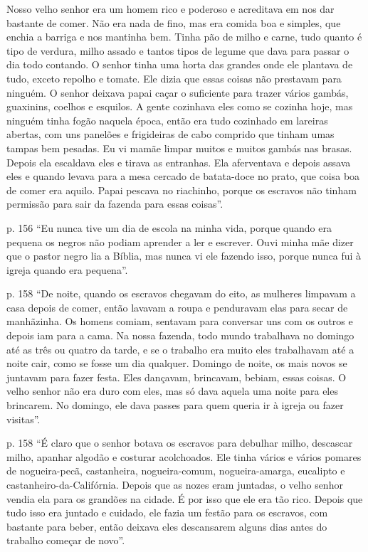 Nosso velho senhor era um homem rico e poderoso e acreditava em nos dar
bastante de comer. Não era nada de fino, mas era comida boa e simples,
que enchia a barriga e nos mantinha bem. Tinha pão de milho e carne,
tudo quanto é tipo de verdura, milho assado e tantos tipos de legume que
dava para passar o dia todo contando. O senhor tinha uma horta das
grandes onde ele plantava de tudo, exceto repolho e tomate. Ele dizia
que essas coisas não prestavam para ninguém. O senhor deixava papai
caçar o suficiente para trazer vários gambás, guaxinins, coelhos e
esquilos. A gente cozinhava eles como se cozinha hoje, mas ninguém tinha
fogão naquela época, então era tudo cozinhado em lareiras abertas, com
uns panelões e frigideiras de cabo comprido que tinham umas tampas bem
pesadas. Eu vi mamãe limpar muitos e muitos gambás nas brasas. Depois
ela escaldava eles e tirava as entranhas. Ela aferventava e depois
assava eles e quando levava para a mesa cercado de batata-doce no prato,
que coisa boa de comer era aquilo. Papai pescava no riachinho, porque os
escravos não tinham permissão para sair da fazenda para essas coisas''.

p. 156 ``Eu nunca tive um dia de escola na minha vida, porque quando era
pequena os negros não podiam aprender a ler e escrever. Ouvi minha mãe
dizer que o pastor negro lia a Bíblia, mas nunca vi ele fazendo isso,
porque nunca fui à igreja quando era pequena''.

p. 158 ``De noite, quando os escravos chegavam do eito, as mulheres
limpavam a casa depois de comer, então lavavam a roupa e penduravam elas
para secar de manhãzinha. Os homens comiam, sentavam para conversar uns
com os outros e depois iam para a cama. Na nossa fazenda, todo mundo
trabalhava no domingo até as três ou quatro da tarde, e se o trabalho
era muito eles trabalhavam até a noite cair, como se fosse um dia
qualquer. Domingo de noite, os mais novos se juntavam para fazer festa.
Eles dançavam, brincavam, bebiam, essas coisas. O velho senhor não era
duro com eles, mas só dava aquela uma noite para eles brincarem. No
domingo, ele dava passes para quem queria ir à igreja ou fazer
visitas''.

p. 158 ``É claro que o senhor botava os escravos para debulhar milho,
descascar milho, apanhar algodão e costurar acolchoados. Ele tinha
vários e vários pomares de nogueira-pecã, castanheira, nogueira-comum,
nogueira-amarga, eucalipto e castanheiro-da-Califórnia. Depois que as
nozes eram juntadas, o velho senhor vendia ela para os grandões na
cidade. É por isso que ele era tão rico. Depois que tudo isso era
juntado e cuidado, ele fazia um festão para os escravos, com bastante
para beber, então deixava eles descansarem alguns dias antes do trabalho
começar de novo''.

